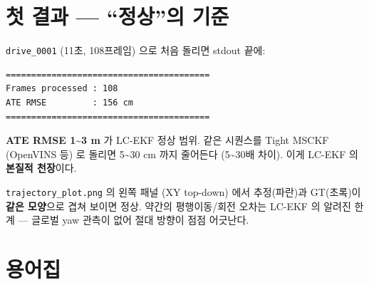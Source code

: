 \documentclass[11pt,a4paper,oneside]{report}
\begin{document}
\section{첫 결과 — ``정상''의 기준}

\texttt{drive\_0001} (11초, 108프레임) 으로 처음 돌리면 stdout 끝에:

\begin{lstlisting}[style=shell]
========================================
Frames processed : 108
ATE RMSE         : 156 cm
========================================
\end{lstlisting}

\textbf{ATE RMSE 1\textasciitilde{}3 m} 가 LC-EKF 정상 범위. 같은 시퀀스를 Tight MSCKF (OpenVINS 등) 로 돌리면 5\textasciitilde{}30 cm 까지 줄어든다 (5\textasciitilde{}30배 차이). 이게 LC-EKF 의 \textbf{본질적 천장}이다.

\texttt{trajectory\_plot.png} 의 왼쪽 패널 (XY top-down) 에서 추정(파란)과 GT(초록)이 \textbf{같은 모양}으로 겹쳐 보이면 정상. 약간의 평행이동/회전 오차는 LC-EKF 의 알려진 한계 — 글로벌 yaw 관측이 없어 절대 방향이 점점 어긋난다.

\section{용어집}
\end{document}

